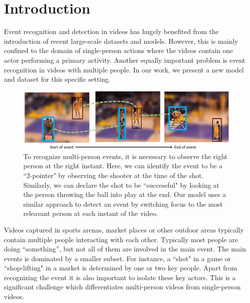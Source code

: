 \section{Introduction}

Event recognition and detection in videos has hugely benefited from the
introduction of recent large-scale datasets \cite{THUMOS,UCF101,Karpathy_CVPR14,MED11} and models.
However, this is mainly confined to the domain of single-person actions
where the videos contain one actor performing a primary activity.
Another equally important problem is event recognition in
videos with multiple people. In our work, we present a new model
and dataset for this specific setting.

\begin{figure}[ht!]
\begin{center}
  \includegraphics[width=3.5 in]{images/pull_figure_v2_cropped.pdf}
\end{center}
\caption{To recognize multi-person events, it is necessary to observe the right
person at the right instant. Here, we can identify the
event to be a ``2-pointer" by observing the shooter at the time of the shot.
Similarly, we can declare the shot to be ``successful" by looking at the
person throwing the ball into play at the end. Our model uses a similar approach to detect
an event by switching focus to the most releavant person at each instant of the video.}
\label{fig:pull_figure}
\end{figure}

Videos captured in sports arenas, market places or other outdoor areas
typically contain multiple people interacting with each other.
Typically most people are doing ``something'', but not all of them are involved in the main event.
The main events is dominated by a smaller subset. For instance, a ``shot" in a game
or ``shop-lifting" in a market is determined by one or two key people.
Apart from recognizing the event it is also important
to isolate these key actors. This is a significant challenge which
differentiates multi-person videos from single-person videos.

